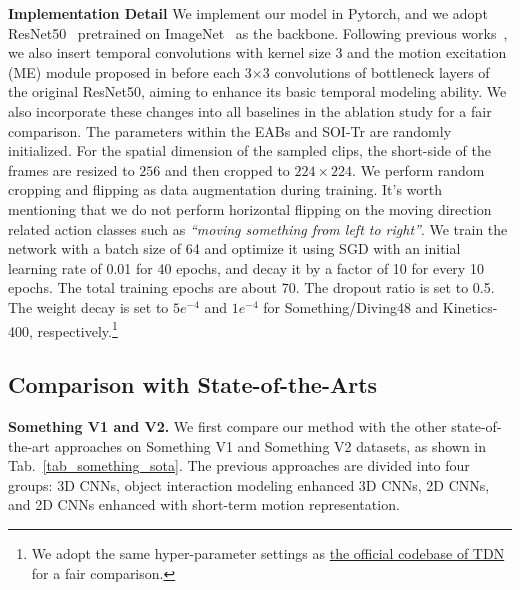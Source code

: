 \noindent \textbf{Implementation Detail}
We implement our model in Pytorch, and we adopt ResNet50~\cite{he2016deep} pretrained on ImageNet~\cite{deng2009imagenet} as the backbone.
Following previous works~\cite{kwon2020motionsqueeze}\cite{li2020tea}, we also insert temporal convolutions with kernel size 3 and the motion excitation (ME) module proposed in \cite{li2020tea} before each 3$\times$3 convolutions of bottleneck layers of the original ResNet50, aiming to enhance its basic temporal modeling ability. We also incorporate these changes into all baselines in the ablation study for a fair comparison. 
The parameters within the EABs and SOI-Tr are randomly initialized.
For the spatial dimension of the sampled clips, the short-side of the frames are resized to $256$ and then cropped to $224\times224$. We perform random cropping and flipping as data augmentation during training.
It's worth mentioning that we do not perform horizontal flipping on the moving direction related action classes such as \textit{``moving something from left to right''}.
We train the network with a batch size of 64 and optimize it using SGD with an initial learning rate of 0.01 for 40 epochs, and decay it by a factor of 10 for every 10 epochs. The total training epochs are about 70.
The dropout ratio is set to 0.5. The weight decay is set to $5e^{-4}$ and $1e^{-4}$ for Something/Diving48 and Kinetics-400, respectively.\footnote{We adopt the same hyper-parameter settings as \href{https://github.com/MCG-NJU/TDN}{the official codebase of TDN}
for a fair comparison.}






\spaceabovesubsection
\subsection{Comparison with State-of-the-Arts}



 \textbf{Something V1 and V2.}
We first compare our method with the other state-of-the-art approaches on Something V1 and Something V2 datasets, as shown in Tab.~\ref{tab_something_sota}.
The previous approaches are divided into four groups: 3D CNNs, object interaction modeling enhanced 3D CNNs, 2D CNNs, and 2D CNNs enhanced with short-term motion representation.

